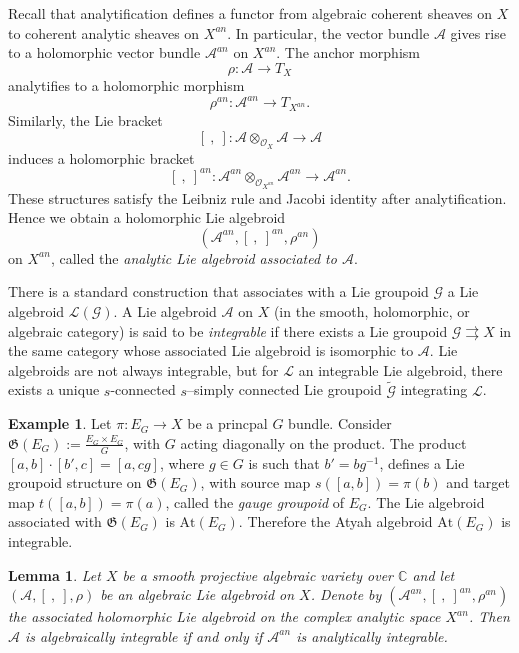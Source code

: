 \documentclass[12pt,reqno]{amsart}
\numberwithin{equation}{subsection}
\newtheorem{lem}[equation]{Lemma}
\theoremstyle{definition}
\newtheorem{example}[equation]{Example}
\theoremstyle{theorem}
\begin{document}
Recall that analytification defines a functor from algebraic coherent
sheaves on $X$ to coherent analytic sheaves on $X^{an}$. In particular,
the vector bundle $\mathcal{A}$ gives rise to a holomorphic vector bundle
$\mathcal{A}^{an}$ on $X^{an}$. The anchor morphism
\[
\rho : \mathcal{A} \longrightarrow T_X
\]
analytifies to a holomorphic morphism
\[
\rho^{an} : \mathcal{A}^{an} \longrightarrow T_{X^{an}} .
\]
Similarly, the Lie bracket
\[
[\ ,\ ] : \mathcal{A} \otimes_{\mathcal{O}_X} \mathcal{A}
\longrightarrow \mathcal{A}
\]
induces a holomorphic bracket
\[
[\ ,\ ]^{an} : \mathcal{A}^{an} \otimes_{\mathcal{O}_{X^{an}}}
\mathcal{A}^{an} \longrightarrow \mathcal{A}^{an}.
\]
These structures satisfy the Leibniz rule and Jacobi identity after
analytification. Hence we obtain a holomorphic Lie algebroid
\[
(\mathcal{A}^{an},[\ ,\ ]^{an},\rho^{an})
\]
on $X^{an}$, called the \emph{analytic Lie algebroid associated to
	$\mathcal{A}$}.

There is a standard construction that associates with a Lie groupoid $\mathcal{G}$ a Lie algebroid $\mathcal{L}(\mathcal{G})$. A Lie algebroid $\mathcal{A}$ on $X$ (in the smooth, holomorphic, or algebraic category) is said to be \textit{integrable} if there exists a Lie groupoid $\mathcal{G} \rightrightarrows X$ in the same category whose associated Lie algebroid is isomorphic to $\mathcal{A}$. Lie algebroids are not always integrable, but for $\mathcal{L}$ an integrable Lie algebroid, there exists a unique $s$-connected $s$--simply connected Lie groupoid $\tilde{\mathcal{G}}$ integrating $\mathcal{L}$.

\begin{example}
Let $\pi:E_{G}\rightarrow X$ be a princpal $G$ bundle. Consider $\mathfrak{G}(E_{G}):=\frac{E_{G}\times E_{G}}{G}$, with $G$ acting diagonally on the product. The product $[a,b]\cdot[b',c] = [a,cg]$, where $g\in G$ is such that $b'=bg^{-1}$, defines a Lie groupoid structure on $\mathfrak{G}(E_{G})$, with source map $s([a,b])=\pi(b)$ and target map $t([a,b]) = \pi(a)$, called the \textit{gauge groupoid} of $E_{G}$. The Lie algebroid associated with $\mathfrak{G}(E_{G})$ is $\text{At}(E_{G})$. Therefore the Atyah algebroid $\text{At}(E_{G})$ is integrable.
\end{example}

\begin{lem}\label{lemma:-analytic-integrability-variety}
	Let $X$ be a smooth projective algebraic variety over $\mathbb{C}$ and let
	$(\mathcal{A},[\ ,\ ],\rho)$ be an algebraic Lie algebroid on $X$.
	Denote by $(\mathcal{A}^{an},[\ ,\ ]^{an},\rho^{an})$ the associated
	holomorphic Lie algebroid on the complex analytic space $X^{an}$.
	Then $\mathcal{A}$ is algebraically integrable if and only if
	$\mathcal{A}^{an}$ is analytically integrable.
\end{lem}
\end{document}
